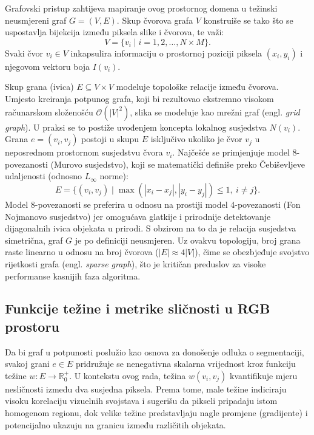 \documentclass[11pt,a4paper]{article}
\begin{document}
Grafovski pristup zahtijeva mapiranje ovog prostornog domena u težinski neusmjereni graf $G = (V, E)$. Skup čvorova grafa $V$ konstruiše se tako što se uspostavlja bijekcija između piksela slike i čvorova, te važi:
\begin{equation}
    V = \{v_i \mid i = 1, 2, \dots, N \times M\}.
\end{equation}
Svaki čvor $v_i \in V$ inkapsulira informaciju o prostornoj poziciji piksela $(x_i, y_i)$ i njegovom vektoru boja $I(v_i)$. 

Skup grana (ivica) $E \subseteq V \times V$ modeluje topološke relacije između čvorova. Umjesto kreiranja potpunog grafa, koji bi rezultovao ekstremno visokom računarskom složenošću $\mathcal{O}(|V|^2)$, slika se modeluje kao mrežni graf (engl. \textit{grid graph}). U praksi se to postiže uvođenjem koncepta lokalnog susjedstva $N(v_i)$. Grana $e = (v_i, v_j)$ postoji u skupu $E$ isključivo ukoliko je čvor $v_j$ u neposrednom prostornom susjedstvu čvora $v_i$. Najčešće se primjenjuje model 8-povezanosti (Murovo susjedstvo), koji se matematički definiše preko Čebiševljeve udaljenosti (odnosno $L_\infty$ norme):
\begin{equation}
    E = \{ (v_i, v_j) \mid \max(|x_i - x_j|, |y_i - y_j|) \le 1, \ i \neq j \}.
\end{equation}
Model 8-povezanosti se preferira u odnosu na prostiji model 4-povezanosti (Fon Nojmanovo susjedstvo) jer omogućava glatkije i prirodnije detektovanje dijagonalnih ivica objekata u prirodi. S obzirom na to da je relacija susjedstva simetrična, graf $G$ je po definiciji neusmjeren. Uz ovakvu topologiju, broj grana raste linearno u odnosu na broj čvorova ($|E| \approx 4|V|$), čime se obezbjeđuje svojstvo rijetkosti grafa (engl. \textit{sparse graph}), što je kritičan preduslov za visoke performanse kasnijih faza algoritma.

\subsection{Funkcije težine i metrike sličnosti u RGB prostoru}
Da bi graf u potpunosti poslužio kao osnova za donošenje odluka o segmentaciji, svakoj grani $e \in E$ pridružuje se nenegativna skalarna vrijednost kroz funkciju težine $w: E \rightarrow \mathbb{R}^+_{0}$. U kontekstu ovog rada, težina $w(v_i, v_j)$ kvantifikuje mjeru nesličnosti između dva susjedna piksela. Prema tome, male težine indiciraju visoku korelaciju vizuelnih svojstava i sugerišu da pikseli pripadaju istom homogenom regionu, dok velike težine predstavljaju nagle promjene (gradijente) i potencijalno ukazuju na granicu između različitih objekata.
\end{document}
